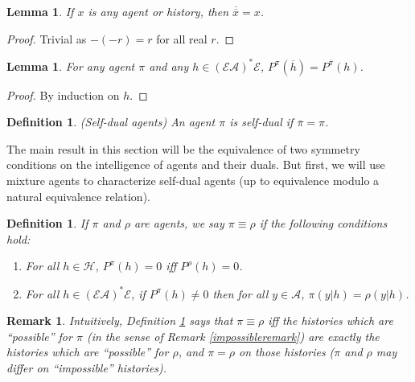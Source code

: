 \documentclass[twoside]{article}
\newtheorem{definition}[theorem]{Definition}
\newtheorem{remark}[theorem]{Remark}
\newtheorem{lemma}[theorem]{Lemma}
\begin{document}
\begin{lemma}
\label{doublenegationlemma}
    If $x$ is any agent or history,
    then
    $\overline{\overline x}=x$.
\end{lemma}

\begin{proof}
    Trivial as $-(-r)=r$ for all real $r$.
\end{proof}

\begin{lemma}
\label{asteriskcommuteswithoverlinelemma}
    For any agent $\pi$ and any $h\in(\mathcal E\mathcal A)^*\mathcal E$,
    $P^\pi(\overline h)=P^{\overline{\pi}}(h)$.
\end{lemma}

\begin{proof}
    By induction on $h$.
\end{proof}

\begin{definition}
    (Self-dual agents)
    An agent $\pi$ is \emph{self-dual} if $\overline{\pi}=\pi$.
\end{definition}

The main result in this section will be the equivalence of two
symmetry conditions on the intelligence of agents and their duals.
But first, we will use mixture agents to characterize
self-dual agents (up to equivalence modulo a natural equivalence relation).

\begin{definition}
\label{equivdefn}
    If $\pi$ and $\rho$ are agents, we say $\pi\equiv\rho$ if the
    following conditions hold:
    \begin{enumerate}
        \item For all $h\in\mathcal H$, $P^\pi(h)=0$ iff $P^\rho(h)=0$.
        \item For all $h\in(\mathcal E\mathcal A)^*\mathcal E$,
            if $P^\pi(h)\not=0$ then for all $y\in\mathcal A$,
            $\pi(y|h)=\rho(y|h)$.
    \end{enumerate}
\end{definition}

\begin{remark}
    Intuitively, Definition \ref{equivdefn} says that $\pi\equiv\rho$
    iff the histories which are ``possible'' for $\pi$ (in the sense of
    Remark \ref{impossibleremark}) are exactly the histories which are
    ``possible'' for $\rho$, and $\pi=\rho$ on those histories
    ($\pi$ and $\rho$ may differ on ``impossible'' histories).
\end{remark}
\end{document}

